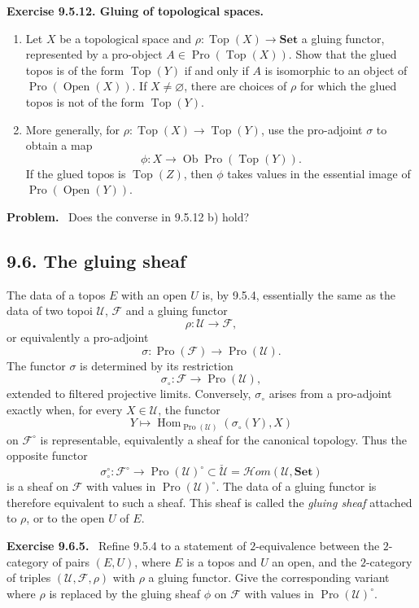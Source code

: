 \documentclass[11pt]{article}
\newcommand{\Uu}{\mathcal{U}}
\newcommand{\Ff}{\mathcal{F}}
\newcommand{\Set}{\mathbf{Set}}
\newcommand{\Top}{\operatorname{Top}}
\newcommand{\Ouv}{\operatorname{Open}}
\newcommand{\Hom}{\operatorname{Hom}}
\newcommand{\Ob}{\operatorname{Ob}}
\newcommand{\Pro}{\operatorname{Pro}}
\newcommand{\Hhom}{\mathcal{H}om}
\newenvironment{remarktext}[1]{\par\medskip\noindent\textbf{#1.}\ }{\par\medskip}
\begin{document}
\begin{remarktext}{Exercise 9.5.12. Gluing of topological spaces}
\begin{enumerate}[label=\alph*)]
\item Let \(X\) be a topological space and \(\rho:\Top(X)\to\Set\) a gluing functor, represented by a pro-object \(A\in\Pro(\Top(X))\). Show that the glued topos is of the form \(\Top(Y)\) if and only if \(A\) is isomorphic to an object of \(\Pro(\Ouv(X))\). If \(X\ne\varnothing\), there are choices of \(\rho\) for which the glued topos is not of the form \(\Top(Y)\).
\item More generally, for \(\rho:\Top(X)\to\Top(Y)\), use the pro-adjoint \(\sigma\) to obtain a map
\[
\phi:X\longrightarrow \Ob\Pro(\Top(Y)).
\]
If the glued topos is \(\Top(Z)\), then \(\phi\) takes values in the essential image of \(\Pro(\Ouv(Y))\).
\end{enumerate}
\end{remarktext}

\begin{remarktext}{Problem}
Does the converse in 9.5.12 b) hold?
\end{remarktext}

\subsection*{9.6. The gluing sheaf}

The data of a topos \(E\) with an open \(U\) is, by 9.5.4, essentially the same as the data of two topoi \(\Uu\), \(\Ff\) and a gluing functor
\[
\rho:\Uu\longrightarrow\Ff,
\tag{9.6.1}
\]
or equivalently a pro-adjoint
\[
\sigma:\Pro(\Ff)\longrightarrow\Pro(\Uu).
\tag{9.6.2}
\]
The functor \(\sigma\) is determined by its restriction
\[
\sigma_\circ:\Ff\longrightarrow\Pro(\Uu),
\tag{9.6.3}
\]
extended to filtered projective limits. Conversely, \(\sigma_\circ\) arises from a pro-adjoint exactly when, for every \(X\in\Uu\), the functor
\[
Y\longmapsto \Hom_{\Pro(\Uu)}(\sigma_\circ(Y),X)
\]
on \(\Ff^{\circ}\) is representable, equivalently a sheaf for the canonical topology. Thus the opposite functor
\[
\sigma_\circ^{\circ}:\Ff^\circ\longrightarrow\Pro(\Uu)^\circ\subset\check{\Uu}=\Hhom(\Uu,\Set)
\tag{9.6.4}
\]
is a sheaf on \(\Ff\) with values in \(\Pro(\Uu)^\circ\). The data of a gluing functor is therefore equivalent to such a sheaf. This sheaf is called the \emph{gluing sheaf} attached to \(\rho\), or to the open \(U\) of \(E\).

\begin{remarktext}{Exercise 9.6.5}
Refine 9.5.4 to a statement of \(2\)-equivalence between the \(2\)-category of pairs \((E,U)\), where \(E\) is a topos and \(U\) an open, and the \(2\)-category of triples \((\Uu,\Ff,\rho)\) with \(\rho\) a gluing functor. Give the corresponding variant where \(\rho\) is replaced by the gluing sheaf \(\phi\) on \(\Ff\) with values in \(\Pro(\Uu)^\circ\).
\end{remarktext}
\end{document}
